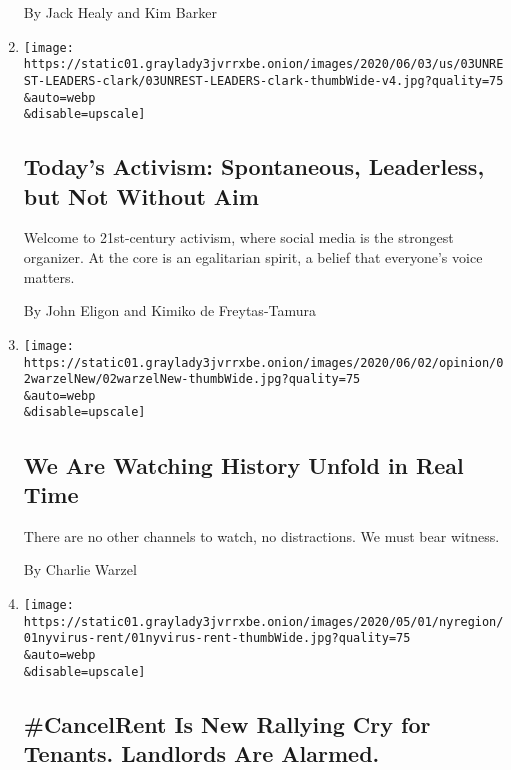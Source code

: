\begin{enumerate}
  By Jack Healy and Kim Barker
\item
  \href{/2020/06/03/us/leaders-activists-george-floyd-protests.html}{}

  \texttt{[image: https://static01.graylady3jvrrxbe.onion/images/2020/06/03/us/03UNREST-LEADERS-clark/03UNREST-LEADERS-clark-thumbWide-v4.jpg?quality=75\\\&auto=webp\\\&disable=upscale]}

  \hypertarget{todays-activism-spontaneous-leaderless-but-not-without-aim}{%
  \subsection{Today's Activism: Spontaneous, Leaderless, but Not Without
  Aim}\label{todays-activism-spontaneous-leaderless-but-not-without-aim}}

  Welcome to 21st-century activism, where social media is the strongest
  organizer. At the core is an egalitarian spirit, a belief that
  everyone's voice matters.

  By John Eligon and Kimiko de Freytas-Tamura
\item
  \href{/2020/06/02/opinion/floyd-protest-twitter.html}{}

  \texttt{[image: https://static01.graylady3jvrrxbe.onion/images/2020/06/02/opinion/02warzelNew/02warzelNew-thumbWide.jpg?quality=75\\\&auto=webp\\\&disable=upscale]}

  \hypertarget{we-are-watching-history-unfold-in-real-time}{%
  \subsection{We Are Watching History Unfold in Real
  Time}\label{we-are-watching-history-unfold-in-real-time}}

  There are no other channels to watch, no distractions. We must bear
  witness.

  By Charlie Warzel
\item
  \href{/2020/05/01/nyregion/rent-strike-coronavirus.html}{}

  \texttt{[image: https://static01.graylady3jvrrxbe.onion/images/2020/05/01/nyregion/01nyvirus-rent/01nyvirus-rent-thumbWide.jpg?quality=75\\\&auto=webp\\\&disable=upscale]}

  \hypertarget{cancelrent-is-new-rallying-cry-for-tenants-landlords-are-alarmed}{%
  \subsection{\#CancelRent Is New Rallying Cry for Tenants. Landlords
  Are
  Alarmed.}\label{cancelrent-is-new-rallying-cry-for-tenants-landlords-are-alarmed}}


\end{enumerate}
